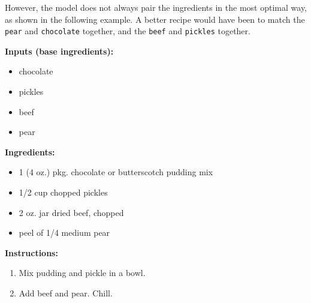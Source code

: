 However, the model does not always pair the ingredients in the most optimal way, as shown in the following example. A better recipe would have been to match the \texttt{pear} and \texttt{chocolate} together, and the \texttt{beef} and \texttt{pickles} together.

\begin{tcolorbox}[recipebox={Dried Beef And Pear Salad}]
	\textbf{Inputs (base ingredients):}
	\begin{itemize}
		\item chocolate
		\item pickles
		\item beef
		\item pear
	\end{itemize}

	\vspace{0.5em}
	\textbf{Ingredients:}
	\begin{itemize}
		\item 1 (4 oz.) pkg. chocolate or butterscotch pudding mix
		\item 1/2 cup chopped pickles
		\item 2 oz. jar dried beef, chopped
		\item peel of 1/4 medium pear
	\end{itemize}

	\vspace{0.5em}
	\textbf{Instructions:}
	\begin{enumerate}
		\item Mix pudding and pickle in a bowl.
		\item Add beef and pear. Chill.
	\end{enumerate}
\end{tcolorbox}